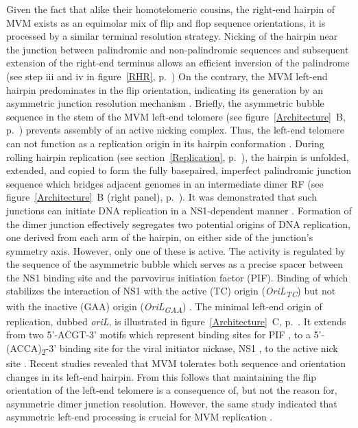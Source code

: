 Given the fact that alike their homotelomeric cousins, the right-end hairpin of MVM exists as an equimolar mix of flip and flop sequence orientations, it is processed by a similar terminal resolution strategy. Nicking of the hairpin near the junction between palindromic and non-palindromic sequences and subsequent extension of the right-end terminus allows an efficient inversion of the palindrome (see step iii and iv in figure~\ref{RHR}, p.~\pageref{RHR}) On the contrary, the MVM left-end hairpin predominates in the flip orientation, indicating its generation by an asymmetric junction resolution mechanism \cite{pmid12743281}. Briefly, the asymmetric bubble sequence in the stem of the MVM left-end telomere (see figure~\ref{Architecture}~B, p.~\pageref{Architecture}) prevents assembly of an active nicking complex. Thus, the left-end telomere can not function as a replication origin in its hairpin conformation \cite{pmid8995615}. During rolling hairpin replication (see section~\ref{Replication}, p.~\pageref{Replication}), the hairpin is unfolded, extended, and copied to form the fully basepaired, imperfect palindromic junction sequence which bridges adjacent genomes in an intermediate dimer RF (see figure~\ref{Architecture}~B (right panel), p.~\pageref{Architecture}). It was demonstrated that such junctions can initiate DNA replication in a NS1-dependent manner \cite{pmid8076610, pmid1530771}. Formation of the dimer junction effectively segregates two potential origins of DNA replication, one derived from each arm of the hairpin, on either side of the junction's symmetry axis. However, only one of these is active. The activity is regulated by the sequence of the asymmetric bubble which serves as a precise spacer between the NS1 binding site and the parvovirus initiation factor (PIF). Binding of which stabilizes the interaction of NS1 with the active (TC) origin (\textit{OriL\textsubscript{TC}}) but not with the inactive (GAA) origin (\textit{OriL\textsubscript{GAA}}) \cite{pmid11435581}. The minimal left-end origin of replication, dubbed \textit{oriL}, is illustrated in figure~\ref{Architecture}~C, p.~\pageref{Architecture}. It extends from two 5'-ACGT-3' motifs which represent binding sites for PIF \cite{pmid8995666, pmid9223459, pmid10523663}, to a 5'-(ACCA)\textsubscript{2}-3' binding site for the viral initiator nickase, NS1 \cite{pmid7853501}, to the active nick site \cite{pmid8076610}. Recent studies revealed that MVM tolerates both sequence and orientation changes in its left-end hairpin. From this follows that maintaining the flip orientation of the left-end telomere is a consequence of, but not the reason for, asymmetric dimer junction resolution. However, the same study indicated that asymmetric left-end processing is crucial for MVM replication \cite{pmid22933276}.  

